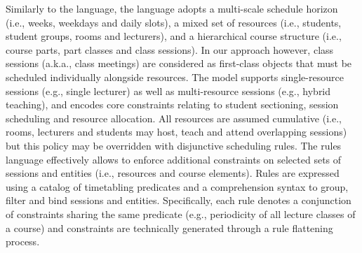 Similarly to the {\ITC} language, 
the {\UTP} language adopts a multi-scale schedule horizon (i.e., weeks, weekdays and daily slots), a mixed set of resources (i.e., students, student groups, rooms and lecturers), and a hierarchical course structure (i.e., course parts, part classes and class sessions). In our approach however, class sessions (a.k.a., class meetings) are considered as first-class objects that must be scheduled individually alongside resources. 
The model supports single-resource sessions (e.g., single lecturer) as well as multi-resource sessions (e.g., hybrid teaching), and encodes core constraints relating to student sectioning, session scheduling and resource allocation. %
All resources are assumed cumulative (i.e., rooms, lecturers and students may host, teach and attend overlapping sessions) but this policy may be overridden with disjunctive scheduling rules.
The rules language effectively allows to enforce additional constraints on selected sets of sessions and entities (i.e., resources and course elements).
Rules are expressed using a catalog of timetabling predicates and a comprehension syntax to group, filter and bind sessions and entities. 
Specifically, each rule denotes a conjunction of \UTP{} constraints sharing the same predicate (e.g., periodicity of all lecture classes of a course) and constraints are technically generated through a rule flattening process. %

